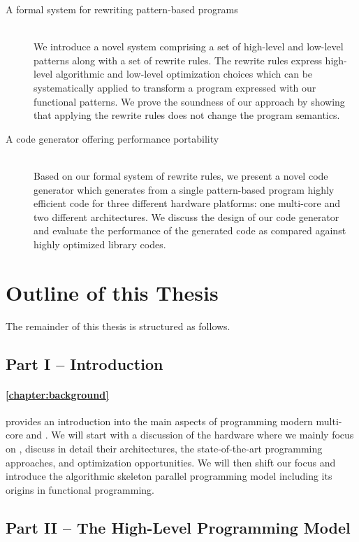 \begin{description}
  \item[A formal system for rewriting pattern-based programs]\hfill\\[-1em]
    We introduce a novel system comprising a set of high-level and low-level patterns along with a set of rewrite rules.
    The rewrite rules express high-level algorithmic and low-level optimization choices which can be systematically applied to transform a program expressed with our functional patterns.
    We prove the soundness of our approach by showing that applying the rewrite rules does not change the program semantics.

  \item[A code generator offering performance portability]\hfill\\[.25em]
    Based on our formal system of rewrite rules, we present a novel code generator which generates from a single pattern-based program highly efficient \OpenCL code for three different hardware platforms:
    one multi-core \CPU and two different \GPU architectures.
    We discuss the design of our code generator and evaluate the performance of the generated \OpenCL code as compared against highly optimized library codes.
\end{description}

\section{Outline of this Thesis}
The remainder of this thesis is structured as follows.

\subsection*{Part I -- Introduction}

\paragraph{\autoref{chapter:background}} provides an introduction into the main aspects of programming modern multi-core \CPUs and \GPUs.
We will start with a discussion of the hardware where we mainly focus on \GPUs, discuss in detail their architectures, the state-of-the-art programming approaches, and optimization opportunities.
We will then shift our focus and introduce the algorithmic skeleton parallel programming model including its origins in functional programming.


\subsection*{Part II -- The \SkelCL High-Level Programming Model}

